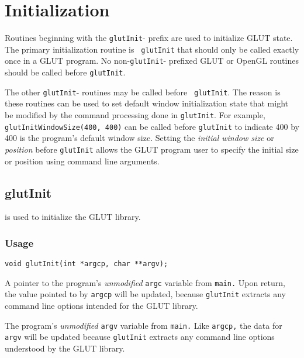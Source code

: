 
\sloppy

\section{Initialization}

Routines beginning with the {\tt glutInit}- prefix are used to
initialize GLUT state.  The primary initialization routine is {\tt
glutInit} that should only be called exactly once in a GLUT program.
No non-{\tt glutInit}- prefixed GLUT or OpenGL routines should be
called before {\tt glutInit}.

The other {\tt glutInit}- routines may be called before {\tt
glutInit}.  The reason is these routines can be used to set default
window initialization state that might be modified by the command
processing done in {\tt glutInit}.  For example, {\tt
glutInitWindowSize(400, 400)} can be called
before {\tt glutInit} to indicate 400 by 400 is the program's default
window size.  Setting the {\em initial window size} or {\em position} before {\tt glutInit}
allows the GLUT program user to specify the initial size or position using
command line arguments.

\subsection{glutInit}

 is used to initialize the GLUT library.

\subsubsection*{Usage}

\begin{verbatim}
void glutInit(int *argcp, char **argv);
\end{verbatim}

\begin{description}
\itemsep 0in
\item[{\tt argcp}] A pointer to the program's
{\em unmodified} {\tt argc} variable from {\tt main.}
Upon return, the value pointed to by {\tt argcp}
will be updated, because {\tt glutInit}
extracts any command line options intended for the GLUT library.

\item[{\tt argv}] The program's {\em unmodified} {\tt argv} variable from
{\tt main.} Like {\tt argcp,} the data for {\tt argv}
will be updated because {\tt glutInit}
extracts any command line options understood by the GLUT library.
\end{description}

